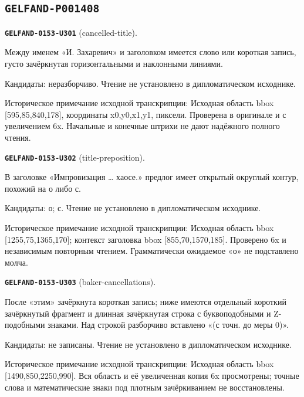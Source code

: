\subsection*{\texttt{GELFAND-P001408}}
\par\noindent\leavevmode{}\label{GELFAND-0153-U301}\textbf{\texttt{GELFAND-0153-U301}} (cancelled-title).\nopagebreak[4]\par
Между именем «И. Захаревич» и заголовком имеется слово или короткая запись, густо зачёркнутая горизонтальными и наклонными линиями.\par
Кандидаты: неразборчиво. Чтение не установлено в дипломатическом исходнике.\par
Историческое примечание исходной транскрипции: Исходная область bbox [595,85,840,178], координаты x0,y0,x1,y1, пиксели. Проверена в оригинале и с увеличением 6x. Начальные и конечные штрихи не дают надёжного полного чтения.\par\medskip
\par\noindent\leavevmode{}\label{GELFAND-0153-U302}\textbf{\texttt{GELFAND-0153-U302}} (title-preposition).\nopagebreak[4]\par
В заголовке «Импровизация … хаосе.» предлог имеет открытый округлый контур, похожий на о либо с.\par
Кандидаты: о; с. Чтение не установлено в дипломатическом исходнике.\par
Историческое примечание исходной транскрипции: Исходная область bbox [1255,75,1365,170]; контекст заголовка bbox [855,70,1570,185]. Проверено 6x и независимым повторным чтением. Грамматически ожидаемое «о» не подставлено молча.\par\medskip
\par\noindent\leavevmode{}\label{GELFAND-0153-U303}\textbf{\texttt{GELFAND-0153-U303}} (baker-cancellations).\nopagebreak[4]\par
После «этим» зачёркнута короткая запись; ниже имеются отдельный короткий зачёркнутый фрагмент и длинная зачёркнутая строка с буквоподобными и Z-подобными знаками. Над строкой разборчиво вставлено «(с точн. до меры 0)».\par
Кандидаты: не записаны. Чтение не установлено в дипломатическом исходнике.\par
Историческое примечание исходной транскрипции: Исходная область bbox [1490,850,2250,990]. Вся область и её увеличенная копия 6x просмотрены; точные слова и математические знаки под плотным зачёркиванием не восстановлены.\par\medskip
